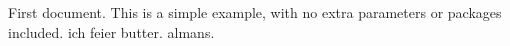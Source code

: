 \documentclass{article}
\begin{document}
First document. This is a simple example, with no
extra parameters or packages included.
ich feier butter.
almans.
\end{document}
